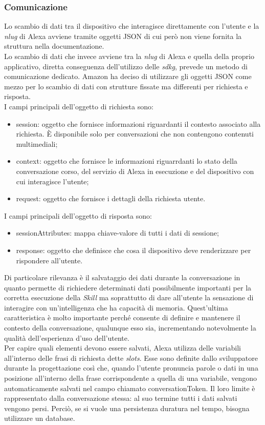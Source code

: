 		\subsubsection{Comunicazione}
		Lo scambio di dati tra il dispositivo che interagisce direttamente con l'utente e la \emph{\gls{nlug}} di Alexa avviene tramite oggetti JSON di cui però non viene fornita la struttura nella documentazione. \\
		Lo scambio di dati che invece avviene tra la \emph{\gls{nlug}} di Alexa e quella della proprio applicativo, diretta conseguenza dell'utilizzo delle \emph{\gls{sdkg}}, prevede un metodo di comunicazione dedicato. Amazon ha deciso di utilizzare gli oggetti JSON come mezzo per lo scambio di dati con strutture fissate ma differenti per richiesta e risposta. \\
		I campi principali dell'oggetto di richiesta sono:
		\begin{itemize}
			\item session: oggetto che fornisce informazioni riguardanti il contesto associato alla richiesta. È disponibile solo per conversazioni che non contengono contenuti multimediali;
			\item context: oggetto che fornisce le informazioni riguarrdanti lo stato della conversazione corso, del servizio di Alexa in esecuzione e del dispositivo con cui interagisce l'utente;
			\item request: oggetto che fornisce i dettagli della richiesta utente.
		\end{itemize}
		I campi principali dell'oggetto di risposta sono:
		\begin{itemize}
			\item sessionAttributes: mappa chiave-valore di tutti i dati di sessione;
			\item response: oggetto che definisce che cosa il dispositivo deve renderizzare per rispondere all'utente.
		\end{itemize}
		Di particolare rilevanza è il salvataggio dei dati durante la conversazione in quanto permette di richiedere determinati dati possibilmente importanti per la corretta esecuzione della \emph{Skill} ma soprattutto di dare all'utente la sensazione di interagire con un'intelligenza che ha capacità di memoria. Quest'ultima caratteristica è molto importante perché consente di definire e mantenere il contesto della conversazione, qualunque esso sia, incrementando notevolmente la qualità dell'esperienza d'uso dell'utente. \\
		Per capire quali elementi devono essere salvati, Alexa utilizza delle variabili all'interno delle frasi di richiesta dette \emph{slots}. Esse sono definite dallo sviluppatore durante la progettazione così che, quando l'utente pronuncia parole o dati in una posizione all'interno della frase corrispondente a quella di una variabile, vengono automaticamente salvati nel campo chiamato conversationToken. Il loro limite è rappresentato dalla conversazione stessa: al suo termine tutti i dati salvati vengono persi. Perciò, se si vuole una persistenza duratura nel tempo, bisogna utilizzare un database.
